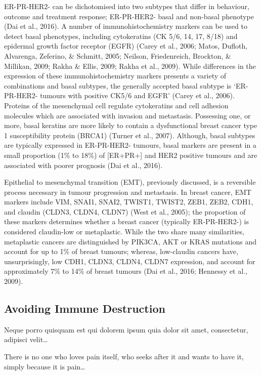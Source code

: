 \documentclass[a4paper, twoside]{templates/ociamthesis}
\begin{document}
ER-PR-HER2- can be dichotomised into two subtypes that differ in behaviour, outcome and treatment response; ER-PR-HER2- basal and non-basal phenotype (Dai et al., 2016). A number of immunohistochemistry markers can be used to detect basal phenotypes, including cytokeratins (CK 5/6, 14, 17, 8/18) and epidermal growth factor receptor (EGFR) (Carey et al., 2006; Matos, Dufloth, Alvarenga, Zeferino, \& Schmitt, 2005; Neilson, Friedenreich, Brockton, \& Millikan, 2009; Rakha \& Ellis, 2009; Rakha et al., 2009). While differences in the expression of these immunohistochemistry markers presents a variety of combinations and basal subtypes, the generally accepted basal subtype is `ER-PR-HER2- tumours with positive CK5/6 and EGFR' (Carey et al., 2006). Proteins of the mesenchymal cell regulate cytokeratins and cell adhesion molecules which are associated with invasion and metastasis. Possessing one, or more, basal keratins are more likely to contain a dysfunctional breast cancer type 1 susceptibility protein (BRCA1) (Turner et al., 2007). Although, basal subtypes are typically expressed in ER-PR-HER2- tumours, basal markers are present in a small proportion (1\% to 18\%) of {[}ER+\textbar PR+{]} and HER2 positive tumours and are associated with poorer prognosis (Dai et al., 2016).

Epithelial to mesenchymal transition (EMT), previously discussed, is a reversible process necessary in tumour progression and metastasis. In breast cancer, EMT markers include VIM, SNAI1, SNAI2, TWIST1, TWIST2, ZEB1, ZEB2, CDH1, and claudin (CLDN3, CLDN4, CLDN7) (West et al., 2005); the proportion of these markers determines whether a breast cancer (typically ER-PR-HER2-) is considered claudin-low or metaplastic. While the two share many similarities, metaplastic cancers are distinguished by PIK3CA, AKT or KRAS mutations and account for up to 1\% of breast tumours; whereas, low-claudin cancers have, unsurprisingly, low CDH1, CLDN3, CLDN4, CLDN7 expression, and account for approximately 7\% to 14\% of breast tumours (Dai et al., 2016; Hennessy et al., 2009).

\hypertarget{avoiding-immune-destruction}{%
\subsection{Avoiding Immune Destruction}\label{avoiding-immune-destruction}}

\begin{savequote}
Neque porro quisquam est qui dolorem ipsum quia dolor sit amet,
consectetur, adipisci velit\ldots{}

There is no one who loves pain itself, who seeks after it and wants to
have it, simply because it is pain\ldots{}
\end{savequote}
\end{document}
